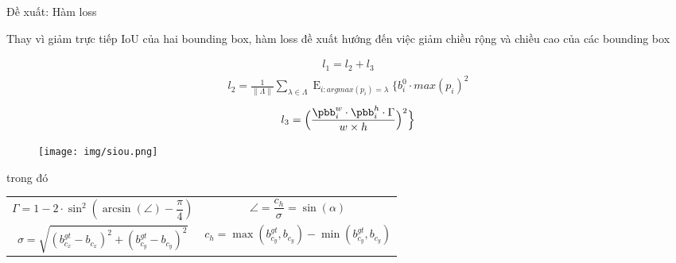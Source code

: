 \documentclass[aspectratio=169, 12pt]{beamer}
\begin{document}
\begin{frame}{Đề xuất: Hàm loss} 

\begin{spacing}{0.8}

Thay vì giảm trực tiếp IoU của hai bounding box, hàm loss đề xuất hướng đến việc giảm chiều rộng và chiều cao của các bounding box

\begin{minipage}{0.55\textwidth}
\setlength{\abovedisplayskip}{5pt}
\setlength{\belowdisplayskip}{5pt}
\begin{align}
\label{l1}
l_{1}  = l_{2} + l_{3} 
\end{align}
%
\begin{align}
\label{eqa:l2}
l_{2} =  \frac{1}{\|\Lambda\|}\sum_{\lambda\in \Lambda} \displaystyle \mathop{E}_{i:argmax(p_i)=\lambda} { \Big\{ b^0_i \cdot max(p_i)^2}
\end{align}
%
\begin{align}
\label{eqa:l3}
l_{3} = 
{\Big(\frac{\pbb^w_i \cdot \pbb^h_i \cdot \Gamma}{w \times h}\Big)^2 \Big\}}
\end{align}
\end{minipage}
%
\hfill
\begin{minipage}{0.39\textwidth}
\begin{figure}[h]
\texttt{[image: img/siou.png]}
\end{figure}
\end{minipage}

trong đó

\begin{table}[]
\begin{tabular}{ll}
\begin{equation}
\Gamma=1-2 \cdot \sin ^2\left(\arcsin (\angle) - \frac{\pi}{4}\right)
\end{equation} & \begin{equation}
\angle =\frac{c_h}{\sigma}=\sin (\alpha)
\end{equation} \\
\begin{equation}
\sigma=\sqrt{\left(b_{c_x}^{g t}-b_{c_x}\right)^2+\left(b_{c_y}^{g t}-b_{c_y}\right)^2}
\end{equation} & \begin{equation}
c_h=\max \left(b_{c_y}^{g t}, b_{c_y}\right)-\min \left(b_{c_y}^{g t}, b_{c_y}\right)
\end{equation}
\end{tabular}
\end{table}

\end{spacing}

\end{frame}
\end{document}

